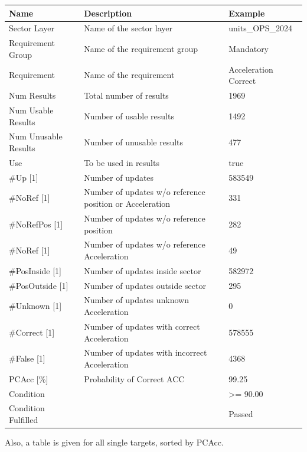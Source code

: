 \begin{center}
 \begin{table}[H]
  \begin{tabularx}{\textwidth}{ | l | X |  l | }
    \hline
    \textbf{Name} & \textbf{Description} & \textbf{Example} \\ \hline
    Sector Layer & Name of the sector layer & units\_OPS\_2024 \\ \hline
    Requirement Group & Name of the requirement group & Mandatory \\ \hline
    Requirement & Name of the requirement & Acceleration Correct \\ \hline
    Num Results & Total number of results & 1969 \\ \hline
    Num Usable Results & Number of usable results & 1492 \\ \hline
    Num Unusable Results & Number of unusable results & 477 \\ \hline
    Use & To be used in results & true \\ \hline
    \#Up [1] & Number of updates & 583549 \\ \hline
    \#NoRef [1] & Number of updates w/o reference position or Acceleration & 331 \\ \hline
    \#NoRefPos [1] & Number of updates w/o reference position & 282 \\ \hline
    \#NoRef [1] & Number of updates w/o reference Acceleration & 49 \\ \hline
    \#PosInside [1] & Number of updates inside sector & 582972 \\ \hline
    \#PosOutside [1] & Number of updates outside sector & 295 \\ \hline
    \#Unknown [1] & Number of updates unknown Acceleration & 0 \\ \hline
    \#Correct [1] & Number of updates with correct Acceleration & 578555 \\ \hline
    \#False [1] & Number of updates with incorrect Acceleration & 4368 \\ \hline
    PCAcc [\%] & Probability of Correct ACC & 99.25 \\ \hline
    Condition &  & >= 90.00 \\ \hline
    Condition Fulfilled &  & Passed \\ \hline
    \end{tabularx}
\end{table}
\end{center}

Also, a table is given for all single targets, sorted by PCAcc.

